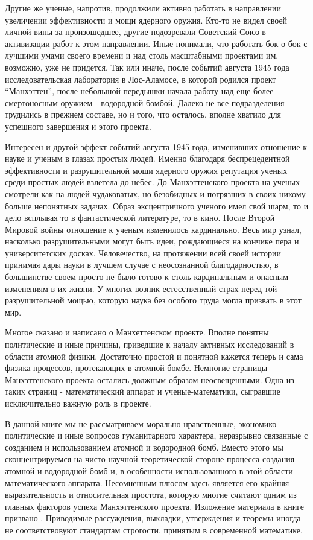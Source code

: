 Другие же ученые, напротив, продолжили активно работать в направлении увеличении эффективности и мощи ядерного оружия.
Кто-то не видел своей личной вины за произошедшее, другие подозревали Советский Союз в активизации работ к этом направлении.
Иные понимали, что работать бок о бок с лучшими умами своего времени и над столь масштабными проектами им, возможно, уже не придется. 
Так или иначе, после событий августа 1945 года исследовательская лаборатория в Лос-Аламосе, в которой родился проект ``Манхэттен'', после небольшой передышки начала работу над еще более смертоносным оружием - водородной бомбой.
Далеко не все подразделения трудились в прежнем составе, но и того, что осталось, вполне хватило для успешного завершения и этого проекта.  

Интересен и другой эффект событий августа 1945 года, изменивших отношение к науке и ученым в глазах простых людей.
Именно благодаря беспрецедентной эффективности и разрушительной мощи ядерного оружия репутация ученых среди простых людей взлетела до небес. 
До Манхэттенского проекта на ученых смотрели как на людей чудаковатых, но безобидных и погрязших в своих никому больше непонятных задачах. 
Образ эксцентричного ученого имел свой шарм, то и дело всплывая то в фантастической литературе, то в кино.
После Второй Мировой войны отношение к ученым изменилось кардинально.
Весь мир узнал, насколько разрушительными могут быть идеи, рождающиеся на кончике пера и университетских досках.
Человечество, на протяжении всей своей истории принимая дары науки в лучшем случае с неосознанной благодарностью, в большинстве своем просто не было готово к столь кардинальным и опасным изменениям в их жизни.
У многих возник естесственный страх перед той разрушительной мощью, которую наука без особого труда могла призвать в этот мир. 

Многое сказано и написано о Манхеттенском проекте.
Вполне понятны политические и иные причины, приведшие к началу активных исследований в области атомной физики.
Достаточно простой и понятной кажется теперь и сама физика процессов, протекающих в атомной бомбе.
Немногие страницы Манхэттенского проекта остались должным образом неосвещенными. 
Одна из таких страниц - математический аппарат и ученые-математики, сыгравшие исключительно важную роль в проекте.

В данной книге мы не рассматриваем морально-нравственные, экономико-политические и иные вопросов гуманитарного характера, неразрывно связанные с созданием и использованием атомной и водородной бомб.
Вместо этого мы сконцентрируемся на чисто научной-теоретической стороне процесса создания атомной и водородной бомб и, в особенности использованного в этой области математического аппарата.
Несомненным плюсом здесь является его крайняя выразительность и относительная простота, которую многие считают одним из главных факторов успеха Манхэттенского проекта.
Изложение материала в книге призвано . Приводимые рассуждения, выкладки, утверждения и теоремы иногда не соответствовуют стандартам строгости, принятым в современной математике. 

